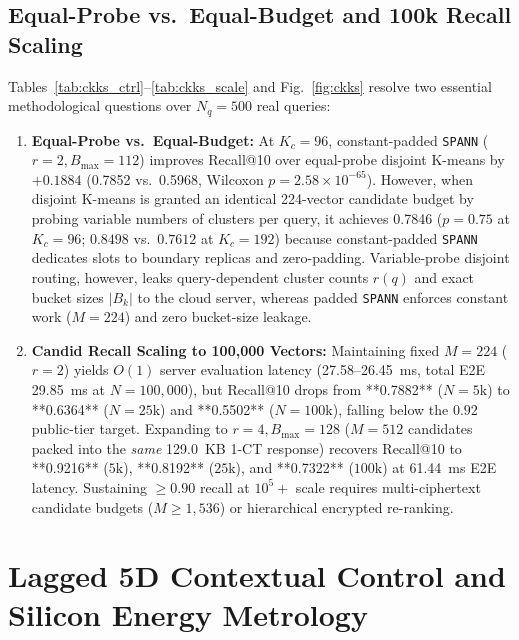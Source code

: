 \documentclass[10pt,journal,compsoc]{IEEEtran}
\begin{document}
\subsection{Equal-Probe vs.\ Equal-Budget and 100k Recall Scaling}
Tables~\ref{tab:ckks_ctrl}--\ref{tab:ckks_scale} and Fig.~\ref{fig:ckks} resolve two essential methodological questions over $N_q = 500$ real queries:
\begin{enumerate}
\item \textbf{Equal-Probe vs.\ Equal-Budget:} At $K_c=96$, constant-padded \texttt{SPANN} ($r=2, B_{\max}=112$) improves Recall@10 over equal-probe disjoint K-means by $+0.1884$ (0.7852 vs.\ 0.5968, Wilcoxon $p = 2.58 \times 10^{-65}$). However, when disjoint K-means is granted an identical 224-vector candidate budget by probing variable numbers of clusters per query, it achieves 0.7846 ($p = 0.75$ at $K_c=96$; $0.8498$ vs.\ $0.7612$ at $K_c=192$) because constant-padded \texttt{SPANN} dedicates slots to boundary replicas and zero-padding. Variable-probe disjoint routing, however, leaks query-dependent cluster counts $r(q)$ and exact bucket sizes $|B_k|$ to the cloud server, whereas padded \texttt{SPANN} enforces constant work ($M=224$) and zero bucket-size leakage.
\item \textbf{Candid Recall Scaling to 100,000 Vectors:} Maintaining fixed $M=224$ ($r=2$) yields $O(1)$ server evaluation latency (27.58--26.45~ms, total E2E 29.85~ms at $N=100,000$), but Recall@10 drops from **0.7882** ($N=5\text{k}$) to **0.6364** ($N=25\text{k}$) and **0.5502** ($N=100\text{k}$), falling below the $0.92$ public-tier target. Expanding to $r=4, B_{\max}=128$ ($M=512$ candidates packed into the \emph{same} 129.0~KB 1-CT response) recovers Recall@10 to **0.9216** ($5\text{k}$), **0.8192** ($25\text{k}$), and **0.7322** ($100\text{k}$) at 61.44~ms E2E latency. Sustaining $\ge 0.90$ recall at $10^5+$ scale requires multi-ciphertext candidate budgets ($M \ge 1,536$) or hierarchical encrypted re-ranking.
\end{enumerate}

\section{Lagged 5D Contextual Control and Silicon Energy Metrology}
\end{document}
